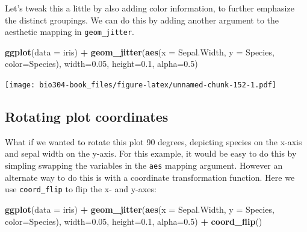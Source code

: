 \documentclass[]{book}
\newenvironment{Shaded}{\begin{snugshade}}{\end{snugshade}}
\newcommand{\DataTypeTok}[1]{\textcolor[rgb]{0.13,0.29,0.53}{#1}}
\newcommand{\FloatTok}[1]{\textcolor[rgb]{0.00,0.00,0.81}{#1}}
\newcommand{\KeywordTok}[1]{\textcolor[rgb]{0.13,0.29,0.53}{\textbf{#1}}}
\newcommand{\NormalTok}[1]{#1}
\newcommand{\OperatorTok}[1]{\textcolor[rgb]{0.81,0.36,0.00}{\textbf{#1}}}
\newcommand{\StringTok}[1]{\textcolor[rgb]{0.31,0.60,0.02}{#1}}
\theoremstyle{definition}
\theoremstyle{definition}
\theoremstyle{definition}
\theoremstyle{remark}
\begin{document}
Let's tweak this a little by also adding color information, to further
emphasize the distinct groupings. We can do this by adding another
argument to the aesthetic mapping in \texttt{geom\_jitter}.

\begin{Shaded}
\begin{Highlighting}[]
\KeywordTok{ggplot}\NormalTok{(}\DataTypeTok{data =}\NormalTok{ iris) }\OperatorTok{+}\StringTok{ }
\StringTok{  }\KeywordTok{geom_jitter}\NormalTok{(}\KeywordTok{aes}\NormalTok{(}\DataTypeTok{x =}\NormalTok{ Sepal.Width, }\DataTypeTok{y =}\NormalTok{ Species, }\DataTypeTok{color=}\NormalTok{Species),}
              \DataTypeTok{width=}\FloatTok{0.05}\NormalTok{, }\DataTypeTok{height=}\FloatTok{0.1}\NormalTok{, }\DataTypeTok{alpha=}\FloatTok{0.5}\NormalTok{)}
\end{Highlighting}
\end{Shaded}

\texttt{[image: bio304-book\_files/figure-latex/unnamed-chunk-152-1.pdf]}

\hypertarget{rotating-plot-coordinates}{%
\subsection{Rotating plot coordinates}\label{rotating-plot-coordinates}}

What if we wanted to rotate this plot 90 degrees, depicting species on
the x-axis and sepal width on the y-axis. For this example, it would be
easy to do this by simpling swapping the variables in the \texttt{aes}
mapping argument. However an alternate way to do this is with a
coordinate transformation function. Here we use \texttt{coord\_flip} to
flip the x- and y-axes:

\begin{Shaded}
\begin{Highlighting}[]
\KeywordTok{ggplot}\NormalTok{(}\DataTypeTok{data =}\NormalTok{ iris) }\OperatorTok{+}\StringTok{ }
\StringTok{  }\KeywordTok{geom_jitter}\NormalTok{(}\KeywordTok{aes}\NormalTok{(}\DataTypeTok{x =}\NormalTok{ Sepal.Width, }\DataTypeTok{y =}\NormalTok{ Species, }\DataTypeTok{color=}\NormalTok{Species),}
              \DataTypeTok{width=}\FloatTok{0.05}\NormalTok{, }\DataTypeTok{height=}\FloatTok{0.1}\NormalTok{, }\DataTypeTok{alpha=}\FloatTok{0.5}\NormalTok{) }\OperatorTok{+}
\StringTok{  }\KeywordTok{coord_flip}\NormalTok{()}
\end{Highlighting}
\end{Shaded}
\end{document}
